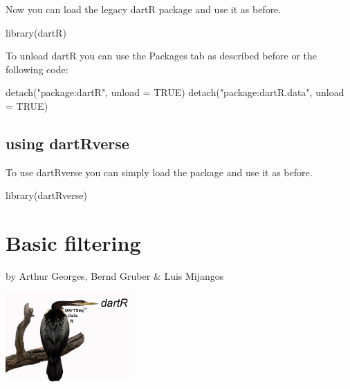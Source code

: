 \documentclass[
  letterpaper,
  DIV=11,
  numbers=noendperiod]{scrreprt}
\newenvironment{Shaded}{\begin{snugshade}}{\end{snugshade}}
\newcommand{\AttributeTok}[1]{\textcolor[rgb]{0.49,0.56,0.16}{#1}}
\newcommand{\ConstantTok}[1]{\textcolor[rgb]{0.53,0.00,0.00}{#1}}
\newcommand{\FunctionTok}[1]{\textcolor[rgb]{0.02,0.16,0.49}{#1}}
\newcommand{\NormalTok}[1]{\textcolor[rgb]{0.00,0.44,0.13}{#1}}
\newcommand{\StringTok}[1]{\textcolor[rgb]{0.25,0.44,0.63}{#1}}
\begin{document}
Now you can load the legacy dartR package and use it as before.

\begin{Shaded}
\begin{Highlighting}[]
\FunctionTok{library}\NormalTok{(dartR)}
\end{Highlighting}
\end{Shaded}

To unload dartR you can use the Packages tab as described before or the
following code:

\begin{Shaded}
\begin{Highlighting}[]
\FunctionTok{detach}\NormalTok{(}\StringTok{"package:dartR"}\NormalTok{, }\AttributeTok{unload =} \ConstantTok{TRUE}\NormalTok{)}
\FunctionTok{detach}\NormalTok{(}\StringTok{"package:dartR.data"}\NormalTok{, }\AttributeTok{unload =} \ConstantTok{TRUE}\NormalTok{)}
\end{Highlighting}
\end{Shaded}

\hypertarget{using-dartrverse}{%
\section*{using dartRverse}\label{using-dartrverse}}


To use dartRverse you can simply load the package and use it as before.

\begin{Shaded}
\begin{Highlighting}[]
\FunctionTok{library}\NormalTok{(dartRverse)}
\end{Highlighting}
\end{Shaded}


\hypertarget{basic-filtering}{%
\chapter{Basic filtering}\label{basic-filtering}}

by Arthur Georges, Bernd Gruber \& Luis Mijangos

\includegraphics[width=1.875in,height=\textheight]{images/logo_old.jpg}
\newpage
\end{document}
